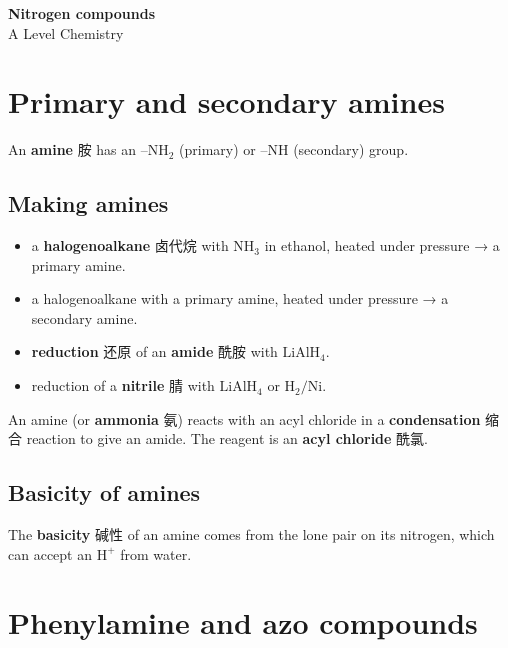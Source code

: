 \documentclass[11pt]{article}
\begin{document}
\begin{center}
  {\LARGE\bfseries Nitrogen compounds}\\[0.35em]
  {\large A Level Chemistry}
\end{center}
\vspace{0.6em}

\section*{Primary and secondary amines}

An \textbf{amine} 胺 has an $\text{–NH}_2$ (primary) or $\text{–NH}$ (secondary) group.

\subsection*{Making amines}

\begin{itemize}
\item a \textbf{halogenoalkane} 卤代烷 with $\text{NH}_3$ in ethanol, heated under pressure → a primary amine.

\item a halogenoalkane with a primary amine, heated under pressure → a secondary amine.

\item \textbf{reduction} 还原 of an \textbf{amide} 酰胺 with $\text{LiAlH}_4$.

\item reduction of a \textbf{nitrile} 腈 with $\text{LiAlH}_4$ or $\text{H}_2/\text{Ni}$.

\end{itemize}

An amine (or \textbf{ammonia} 氨) reacts with an acyl chloride in a \textbf{condensation} 缩合 reaction to give an amide. The reagent is an \textbf{acyl chloride} 酰氯.

\subsection*{Basicity of amines}

The \textbf{basicity} 碱性 of an amine comes from the lone pair on its nitrogen, which can accept an $\text{H}^+$ from water.

\section*{Phenylamine and azo compounds}
\end{document}

